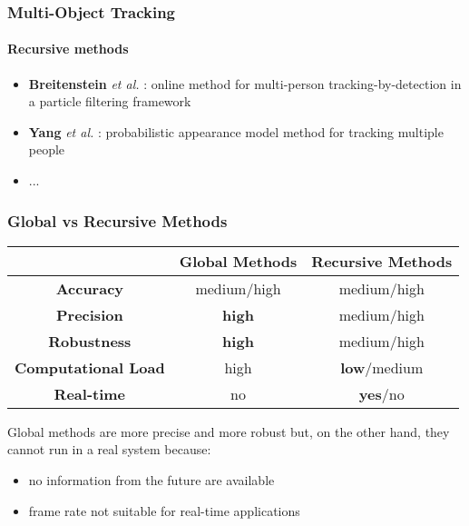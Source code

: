 \begin{frame}
	\frametitle{Multi-Object Tracking}
	\framesubtitle{Recursive methods}
	
	\Large
	
	\vspace{0.2cm}
	
	\begin{itemize}
		\item \textbf{Breitenstein} \emph{et al.} \cite{Breitenstein11}: online method for
			  multi-person tracking-by-detection in a particle filtering framework
		\vspace{0.1cm}
		\item \textbf{Yang} \emph{et al.} \cite{Yang09}: probabilistic appearance model
			  method for tracking multiple people
		\vspace{0.1cm}
		\item ...
	\end{itemize}
\end{frame}

\begin{frame}
	\frametitle{Global vs Recursive Methods}
	
	\begin{table}[!t]
		\centering
		\begin{tabular}{ c | c | c | }
			\cline{2-3}
			& \textbf{Global Methods} & \textbf{Recursive Methods} \\ \hline
			
			\multicolumn{1}{|c|}{\textbf{Accuracy}} & medium/high & medium/high \\ \hline
			\multicolumn{1}{|c|}{\textbf{Precision}} & \textbf{high} & medium/high \\ \hline
			\multicolumn{1}{|c|}{\textbf{Robustness}} & \textbf{high} & medium/high \\ \hline
			\multicolumn{1}{|c|}{\textbf{Computational Load}} & high & \textbf{low}/medium \\ \hline
			\multicolumn{1}{|c|}{\textbf{Real-time}} & no & \textbf{yes}/no \\ \hline
		\end{tabular}
	\end{table}
	
	\vspace{0.4cm}
	
	Global methods are more precise and more robust but, on the other hand, they
	cannot run in a real system because:
	
	\begin{itemize}
		\item no information from the future are available
		\item frame rate not suitable for real-time applications
	\end{itemize}
\end{frame}
